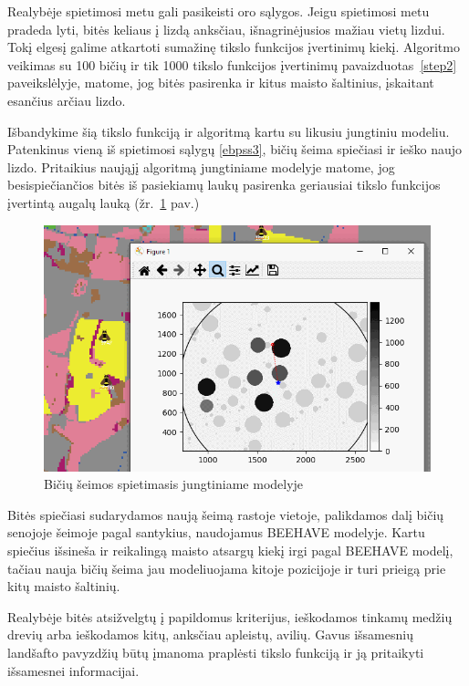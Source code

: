 \documentclass{VUMIFKompMagistrinis}
\begin{document}
Realybėje spietimosi metu gali pasikeisti oro sąlygos. Jeigu spietimosi metu pradeda lyti, bitės keliaus į lizdą anksčiau, išnagrinėjusios mažiau vietų lizdui. Tokį elgesį galime atkartoti sumažinę tikslo funkcijos įvertinimų kiekį. Algoritmo veikimas su 100 bičių ir tik 1000 tikslo funkcijos įvertinimų pavaizduotas~\ref{step2} paveikslėlyje, matome, jog bitės pasirenka ir kitus maisto šaltinius, įskaitant esančius arčiau lizdo. 




Išbandykime šią tikslo funkciją ir algoritmą kartu su likusiu jungtiniu modeliu. Patenkinus vieną iš spietimosi sąlygų \eqref{ebpss3}, bičių šeima spiečiasi ir ieško naujo lizdo.  Pritaikius naująjį algoritmą jungtiniame modelyje matome, jog besispiečiančios bitės iš pasiekiamų laukų pasirenka geriausiai tikslo funkcijos įvertintą augalų lauką (žr.~\ref{img:fin1} pav.)

\begin{figure}
    \centering
    \includegraphics[scale=0.75]{img/new/mags.png}
     \caption{Bičių šeimos spietimasis jungtiniame modelyje}
    \label{img:fin1}
\end{figure}

Bitės spiečiasi sudarydamos naują šeimą rastoje vietoje, palikdamos dalį bičių senojoje šeimoje pagal santykius, naudojamus BEEHAVE modelyje. Kartu spiečius išsineša ir reikalingą maisto atsargų kiekį irgi pagal BEEHAVE modelį, tačiau nauja bičių šeima jau modeliuojama kitoje pozicijoje ir turi prieigą prie kitų maisto šaltinių.

Realybėje bitės atsižvelgtų į papildomus kriterijus, ieškodamos tinkamų medžių drevių arba ieškodamos kitų, anksčiau apleistų, avilių. Gavus išsamesnių landšafto pavyzdžių būtų įmanoma praplėsti tikslo funkciją ir ją pritaikyti išsamesnei informacijai. 
\end{document}
